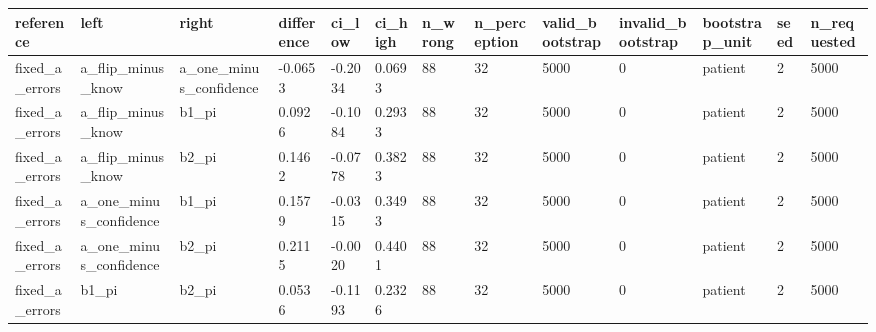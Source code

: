 \begin{tabular}{lllllllllllll}
\hline
reference & left & right & difference & ci\_low & ci\_high & n\_wrong & n\_perception & valid\_bootstrap & invalid\_bootstrap & bootstrap\_unit & seed & n\_requested \\
\hline
fixed\_a\_errors & a\_flip\_minus\_know & a\_one\_minus\_confidence & -0.0653 & -0.2034 & 0.0693 & 88 & 32 & 5000 & 0 & patient & 2 & 5000 \\
fixed\_a\_errors & a\_flip\_minus\_know & b1\_pi & 0.0926 & -0.1084 & 0.2933 & 88 & 32 & 5000 & 0 & patient & 2 & 5000 \\
fixed\_a\_errors & a\_flip\_minus\_know & b2\_pi & 0.1462 & -0.0778 & 0.3823 & 88 & 32 & 5000 & 0 & patient & 2 & 5000 \\
fixed\_a\_errors & a\_one\_minus\_confidence & b1\_pi & 0.1579 & -0.0315 & 0.3493 & 88 & 32 & 5000 & 0 & patient & 2 & 5000 \\
fixed\_a\_errors & a\_one\_minus\_confidence & b2\_pi & 0.2115 & -0.0020 & 0.4401 & 88 & 32 & 5000 & 0 & patient & 2 & 5000 \\
fixed\_a\_errors & b1\_pi & b2\_pi & 0.0536 & -0.1193 & 0.2326 & 88 & 32 & 5000 & 0 & patient & 2 & 5000 \\
\hline
\end{tabular}
